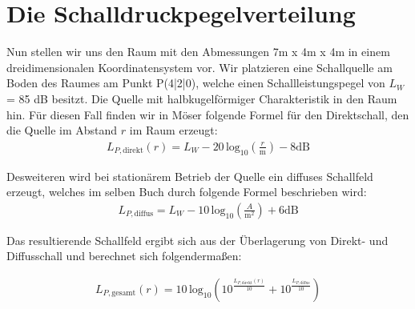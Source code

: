 \section{Die Schalldruckpegelverteilung}
\label{sec:sdpv}

Nun stellen wir uns den Raum mit den Abmessungen 7m x 4m x 4m in einem dreidimensionalen Koordinatensystem vor. Wir platzieren eine Schallquelle am Boden des Raumes am Punkt P(4|2|0), welche einen Schallleistungspegel von $L_W$ = 85 dB besitzt. Die Quelle mit halbkugelförmiger Charakteristik in den Raum hin. Für diesen Fall finden wir in Möser \cite{Moeser15} folgende Formel für den Direktschall, den die Quelle im Abstand $r$ im Raum erzeugt: 
\begin{align*}
L_{P, \mathrm{direkt}}(r) = L_W - 20\,\mathrm{log}_{10} \left( \frac{r}{\mathrm{m}}\right) - 8 \mathrm{dB}
\end{align*} 

Desweiteren wird bei stationärem Betrieb der Quelle ein diffuses Schallfeld erzeugt, welches im selben Buch durch folgende Formel beschrieben wird: 
\begin{align*}
L_{P, \mathrm{diffus}} = L_W - 10\,\mathrm{log}_{10} \left( \frac{A}{\mathrm{m}^2}\right) +6 \mathrm{dB}
\end{align*} 

Das resultierende Schallfeld ergibt sich aus der Überlagerung von Direkt- und Diffusschall und berechnet sich folgendermaßen:

\begin{align*}
L_{P, \mathrm{gesamt}}(r) = 10\,\mathrm{log}_{10}\left(10^{\frac{L_{P,\mathrm{direkt}}(r)}{10}}+ 10^{\frac{L_{P,\mathrm{diffus}}}{10}}\right)
\end{align*} 
